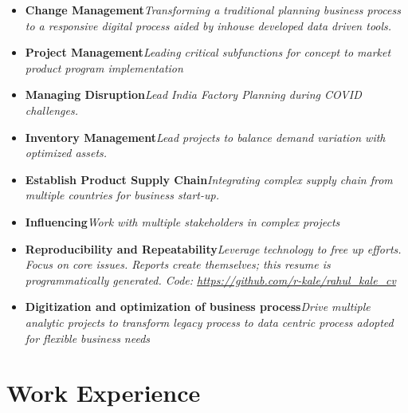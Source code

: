 \documentclass[11pt, a4paper]{awesome-cv}
\providecommand{\tightlist}{%
	\setlength{\itemsep}{0pt}\setlength{\parskip}{0pt}}
\begin{document}
\begin{itemize}
\tightlist
\item
  \textbf{Change Management}\newline  \textit{Transforming a traditional planning business process to a responsive digital process aided by inhouse developed data driven tools.}
\item
  \textbf{Project Management}\newline  \textit{Leading critical subfunctions for concept to market product program implementation}
\item
  \textbf{Managing Disruption}\newline  \textit{Lead India Factory Planning during COVID challenges.}
\item
  \textbf{Inventory Management}\newline  \textit{Lead projects to balance demand variation with optimized assets.}
\item
  \textbf{Establish Product Supply Chain}\newline  \textit{Integrating complex supply chain from multiple countries for business start-up.}
\item
  \textbf{Influencing}\newline  \textit{Work with multiple stakeholders in complex projects}
\item
  \textbf{Reproducibility and Repeatability}\newline  \textit{Leverage technology to free up efforts. Focus on core issues. Reports create themselves; this resume is programmatically generated. 
  Code: \url{https://github.com/r-kale/rahul_kale_cv}}
\item
  \textbf{Digitization and optimization of business process}\newline  \textit{Drive multiple analytic projects to transform legacy process to data centric process adopted for flexible business needs}
\end{itemize}

\hypertarget{work-experience}{%
\section{Work Experience}\label{work-experience}}
\end{document}
